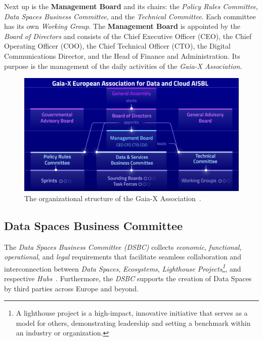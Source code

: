 Next up is the \textbf{Management Board} and its chairs: the \textit{Policy Rules Committee}, \textit{Data Spaces Business Committee}, and the \textit{Technical Committee}.
Each committee has its own \textit{Working Group}.
The \textbf{Management Board} is appointed by the \textit{Board of Directors} and consists of the Chief Executive Officer (CEO), the Chief Operating Officer (COO), the Chief Technical Officer (CTO), the Digital Communications Director, and the Head of Finance and Administration.
Its purpose is the management of the daily activities of the \textit{Gaia-X Association}.

\begin{figure}
    \centering
    \includegraphics[width=\textwidth]{figures/management-board-structure.png}
    \caption{The organizational structure of the Gaia-X Association~\cite{gaiax}.}\label{fig:organizational-board-structure}
\end{figure}

\subsection{Data Spaces Business Committee}\label{subsec:data-spaces-business-committee}

The \textit{Data Spaces Business Committee (DSBC)} collects \textit{economic}, \textit{functional}, \textit{operational}, and \textit{legal} requirements that facilitate seamless collaboration and interconnection between \textit{Data Spaces}, \textit{Ecosystems}, \textit{Lighthouse Projects\footnote{A lighthouse project is a high-impact, innovative initiative that serves as a model for others, demonstrating leadership and setting a benchmark within an industry or organization.}}, and respective \textit{Hubs}~\cite{gaiax}.
Furthermore, the \textit{DSBC} supports the creation of Data Spaces by third parties across Europe and beyond.

